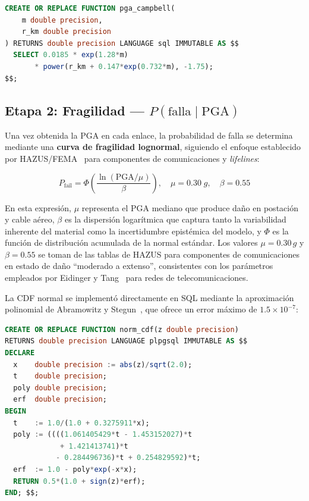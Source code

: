 \documentclass[12pt,a4paper]{article}
\begin{document}
\begin{lstlisting}[language=SQL,caption={Función GMPE Campbell en SQL (05\_modelo\_falla.sql)}]
CREATE OR REPLACE FUNCTION pga_campbell(
    m double precision,
    r_km double precision
) RETURNS double precision LANGUAGE sql IMMUTABLE AS $$
  SELECT 0.0185 * exp(1.28*m)
       * power(r_km + 0.147*exp(0.732*m), -1.75);
$$;
\end{lstlisting}

\subsection{Etapa 2: Fragilidad --- $P(\text{falla}\mid\text{PGA})$}

Una vez obtenida la PGA en cada enlace, la probabilidad de falla se
determina mediante una \textbf{curva de fragilidad lognormal}, siguiendo
el enfoque establecido por HAZUS/FEMA~\cite{hazus} para componentes de
comunicaciones y \textit{lifelines}:

\begin{equation}
P_{\text{fail}} = \Phi\!\left(\frac{\ln(\text{PGA}/\mu)}{\beta}\right),
\quad \mu = 0.30\;g,\quad \beta = 0.55
\label{eq:fragility}
\end{equation}

En esta expresión, $\mu$ representa el PGA mediano que produce daño en
postación y cable aéreo, $\beta$ es la dispersión logarítmica que captura
tanto la variabilidad inherente del material como la incertidumbre
epistémica del modelo, y $\Phi$ es la función de distribución acumulada de
la normal estándar.  Los valores $\mu = 0.30\,g$ y $\beta = 0.55$ se
toman de las tablas de HAZUS para componentes de comunicaciones en
estado de daño ``moderado a extenso'', consistentes con los parámetros
empleados por Eidinger y Tang~\cite{eidinger2012} para redes de
telecomunicaciones.

La CDF normal se implementó directamente en SQL mediante la aproximación
polinomial de Abramowitz y Stegun~\cite{abramowitz1964}, que ofrece un
error máximo de $1.5 \times 10^{-7}$:

\begin{lstlisting}[language=SQL,caption={CDF normal estándar en SQL (05\_modelo\_falla.sql)}]
CREATE OR REPLACE FUNCTION norm_cdf(z double precision)
RETURNS double precision LANGUAGE plpgsql IMMUTABLE AS $$
DECLARE
  x    double precision := abs(z)/sqrt(2.0);
  t    double precision;
  poly double precision;
  erf  double precision;
BEGIN
  t    := 1.0/(1.0 + 0.3275911*x);
  poly := ((((1.061405429*t - 1.453152027)*t
             + 1.421413741)*t
            - 0.284496736)*t + 0.254829592)*t;
  erf  := 1.0 - poly*exp(-x*x);
  RETURN 0.5*(1.0 + sign(z)*erf);
END; $$;
\end{lstlisting}
\end{document}
